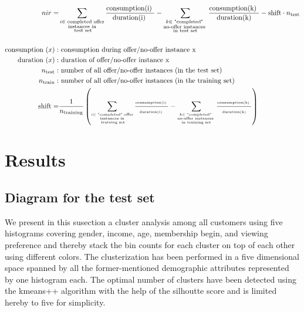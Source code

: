\documentclass[11pt]{article} %
\begin{document}
\begin{align}
nir=& \sum_{\substack{i \in \text{ completed offer}\\ \text{instances in}\\ \text{ test set}}} \frac{ \text{consumption(i) }}{ \text{duration(i) }} -   \sum_{\substack{k \in \text{ "completed" } \\ \text{no-offer instances  }\\ \text{in test set}}} \frac{  \text{consumption(k) }}{ \text{ duration(k) }}-\text{shift}\cdot  n_{\text{test}}
\\
\nonumber\\
 \text{consumption }(x):& \text{\ consumption during offer/no-offer instance x}\nonumber\\ 
 \text{duration }(x):& \text{\ duration of offer/no-offer instance x}\nonumber\\ 
 n_{\text{test}}:& \text{\ number of all offer/no-offer instances (in the test set)}\nonumber\\ 
 n_{\text{train}}:& \text{\ number of all offer/no-offer instances (in the training set)}\nonumber\\ 
 \text{shift}=& {\tiny   \frac{1}{ n_{\text{training}}}   \left(
 \sum_{\substack{i \in \text{ "completed" offer}\\ \text{instances in}\\ \text{ training set}}} \frac{ \text{consumption(i) }}{ \text{duration(i) }} -   \sum_{\substack{k \in \text{ "completed" } \\ \text{no-offer instances  }\\ \text{in training set}}} \frac{  \text{consumption(k) }}{ \text{ duration(k) }}  \right)    }\nonumber
\end{align}




\section{Results}



\subsection{Diagram for the test set}
We present in this susection a cluster analysis among all customers using five histograms covering gender, income, age, membership begin, and viewing preference and thereby stack the bin counts for each cluster on top of each other using different colors. The clusterization has been performed in a five dimensional space spanned by all the former-mentioned demographic attributes represented by one histogram each.
The optimal number of clusters have been detected using the kmeans++ algorithm with the help of the silhoutte score and is limited hereby to five for simplicity.
\end{document}
